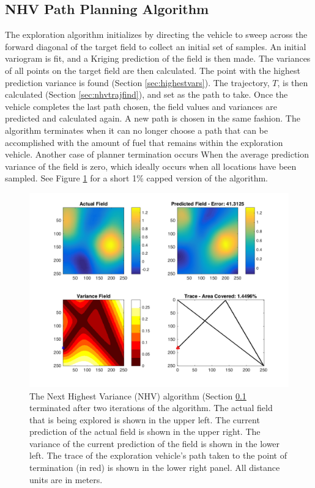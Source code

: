 \subsection{NHV Path Planning Algorithm} \label{sec:nvh_pp_alg}
The exploration algorithm initializes by directing the vehicle to sweep across the forward diagonal of the target field to collect an initial set of samples. An initial variogram is fit, and a Kriging prediction of the field is then made. The variances of all points on the target field are then calculated. The point with the highest prediction variance is found (Section \ref{sec:highestvars}). The trajectory, $T$, is then calculated (Section \ref{sec:nhvtrajfind}), and set as the path to take. Once the vehicle completes the last path chosen, the field values and variances are predicted and calculated again. A new path is chosen in the same fashion. The algorithm terminates when it can no longer choose a path that can be accomplished with the amount of fuel that remains within the exploration vehicle. Another case of planner termination occurs When the average prediction variance of the field is zero, which ideally occurs when all locations have been sampled. See Figure \ref{fig:nhv_pp} for a short 1\% capped version of the algorithm.

\begin{figure}[hb!]
	\centering
	\includegraphics[width=0.95\linewidth]{figures/nhv_4panel.png}
    \captionsetup{skip=0.20\baselineskip,size=footnotesize}
	\caption{The Next Highest Variance (NHV) algorithm (Section \ref{sec:nvh_pp_alg} terminated after two iterations of the algorithm. The actual field that is being explored is shown in the upper left. The current prediction of the actual field is shown in the upper right. The variance of the current prediction of the field is shown in the lower left. The trace of the exploration vehicle's path taken to the point of termination (in red) is shown in the lower right panel. All distance units are in meters.}
	\label{fig:nhv_pp}
\end{figure}

